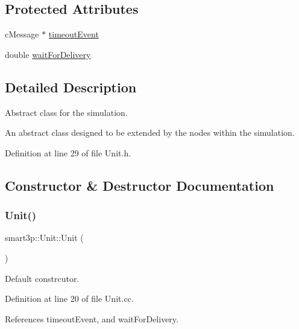 \subsection*{Protected Attributes}
\begin{DoxyCompactItemize}
\item 
c\+Message $\ast$ \hyperlink{classsmart3p_1_1Unit_a48c180587dfed5ccd985f52f4fab6001}{timeout\+Event}
\item 
double \hyperlink{classsmart3p_1_1Unit_a227ec26ef4734fb25d0e697ff3952e8a}{wait\+For\+Delivery}
\end{DoxyCompactItemize}


\subsection{Detailed Description}
Abstract class for the simulation. 

An abstract class designed to be extended by the nodes within the simulation. 

Definition at line 29 of file Unit.\+h.



\subsection{Constructor \& Destructor Documentation}
\mbox{\label{classsmart3p_1_1Unit_ac650bc01f4016ce66b056a9a37793697}} 
\subsubsection{\texorpdfstring{Unit()}{Unit()}}
{\footnotesize\ttfamily smart3p\+::\+Unit\+::\+Unit (\begin{DoxyParamCaption}{ }\end{DoxyParamCaption})}



Default constrcutor. 



Definition at line 20 of file Unit.\+cc.



References timeout\+Event, and wait\+For\+Delivery.

\mbox{\label{classsmart3p_1_1Unit_af5ab11eebd455ae312399fa3ba813e1b}} 
